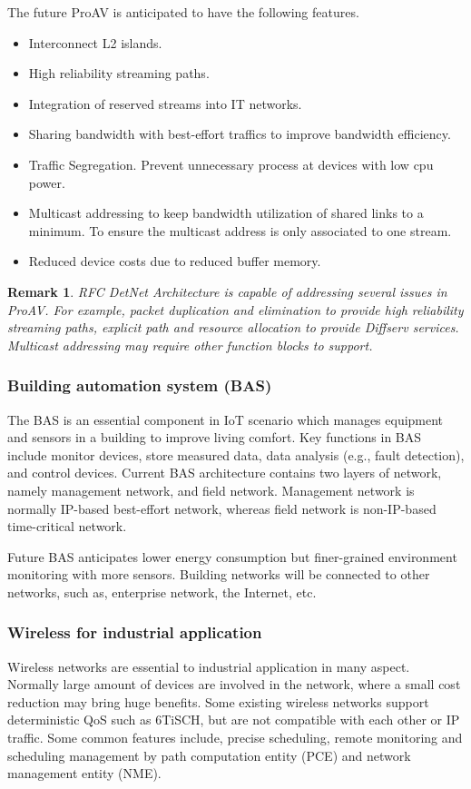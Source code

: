 \documentclass[12pt]{article}
\newtheorem*{remark}{Remark}
\begin{document}
The future ProAV is anticipated to have the following features.
\begin{itemize}
    \item Interconnect L2 islands.
    \item High reliability streaming paths.
    \item Integration of reserved streams into IT networks.
    \item Sharing bandwidth with best-effort traffics to improve bandwidth efficiency. 
    \item Traffic Segregation. Prevent unnecessary process at devices with low cpu power.
    \item Multicast addressing to keep bandwidth utilization
   of shared links to a minimum. To ensure the multicast address is only associated to one stream.
   \item Reduced device costs due to reduced buffer memory.
\end{itemize}

\begin{remark}
RFC DetNet Architecture is capable of addressing several issues in ProAV. For example, packet duplication and elimination to provide high reliability streaming paths, explicit path and resource allocation to provide Diffserv services. Multicast addressing may require other function blocks to support.
\end{remark}


\subsubsection{Building automation system (BAS)}
The BAS is an essential component in IoT scenario which manages equipment and sensors in a building to improve living comfort. Key functions in BAS include monitor devices, store measured data, data analysis (e.g., fault detection), and control devices. Current BAS architecture contains two layers of network, namely management network, and field network. Management network is normally IP-based best-effort network, whereas field network is non-IP-based time-critical network. 

Future BAS anticipates lower energy consumption but  finer-grained environment monitoring with more sensors. Building networks will be connected to other networks, such as, enterprise network, the Internet, etc.  

\subsubsection{Wireless for industrial application}
Wireless networks are essential to industrial application in many aspect. Normally large amount of devices are involved in the network, where a small cost reduction may bring huge benefits.
Some existing wireless networks support deterministic QoS such
as 6TiSCH, but are not compatible with each other or IP traffic. Some common features include, precise scheduling, remote monitoring and scheduling management by path computation entity (PCE) and network management entity (NME). 
\end{document}
